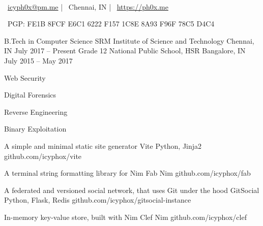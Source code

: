 \documentclass[]{awesome-cv}
\begin{document}
    
\begin{center}
	  \\
	\vspace{2mm}
	{\faEnvelope\ \href{mailto:icyph0x@pm.me}{icyph0x@pm.me}} | {\faMapMarker\ Chennai, IN} | {\faLink\ \url{https://ph0x.me}}
	\begin{center}
		{\faKey\ PGP: FE1B 8FCF E6C1 6222 F157 1C8E 8A93 F96F 78C5 D4C4}
	\end{center} 
\end{center} 


\begin{cventries}
	\cventry
	{B.Tech in Computer Science}
	{SRM Institute of Science and Technology}
	{Chennai, IN}
	{July 2017 – Present}
	{}
	\cventry
	{Grade 12}
	{National Public School, HSR}
	{Bangalore, IN}
	{July 2015 – May 2017}
	{}
\end{cventries}


\vspace{-6mm}
\vspace{3mm}
	{\begin{cvitems}
		\item {Web Security}
		\item {Digital Forensics}
		\item {Reverse Engineering}
		\item {Binary Exploitation}
	\end{cvitems}}

\begin{cventries}
	\cventry
	{A simple and minimal static site generator}
	{Vite}
	{Python, Jinja2}
	{github.com/icyphox/vite}
	{}
	
	\vspace{-5mm}
	\cventry
	{A terminal string formatting library for Nim}
	{Fab}
	{Nim}
	{github.com/icyphox/fab}
	{}

	\vspace{-5mm}
	\cventry
	{A federated and versioned social network, that uses Git under the hood}
	{GitSocial}
	{Python, Flask, Redis}
	{github.com/icyphox/gitsocial-instance}
	{}

	\vspace{-5mm}
	\cventry
	{In-memory key-value store, built with Nim}  
	{Clef}
	{Nim}
	{github.com/icyphox/clef}
	{}
	
	\vspace{-5mm}

\end{cventries}
\end{document}
